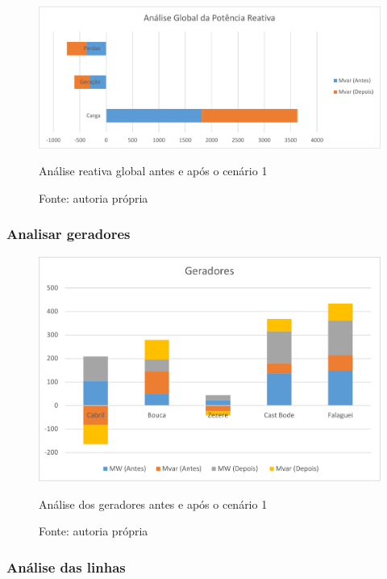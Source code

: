 \begin{figure}[H]
	\centering
	\captionsetup{width=\textwidth, font=footnotesize, textfont=bf}	
	\includegraphics[width=\linewidth]{img/global_MVAr_caso1.pdf}
	\caption{Análise reativa global antes e após o cenário 1}
	\vspace{-3.5mm}
	\caption*{Fonte: autoria própria}
	\label{fig:global_MVAr_caso1}
\end{figure}
\subsubsection{Analisar geradores}

\begin{figure}[H]
	\centering
	\captionsetup{width=\textwidth, font=footnotesize, textfont=bf}	
	\includegraphics[width=\linewidth]{img/geradores_caso1.pdf}
	\caption{Análise dos geradores antes e após o cenário 1}
	\vspace{-3.5mm}
	\caption*{Fonte: autoria própria}
	\label{fig:geradores_caso1}
\end{figure}


\subsubsection{Análise das linhas}

